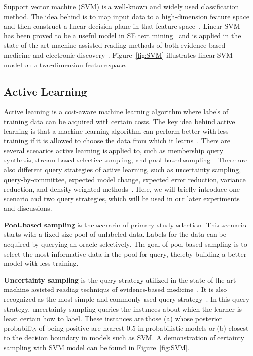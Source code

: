 \documentclass[final,twocolumn,5p]{elsarticle}
\theoremstyle{break}
\begin{document}
Support vector machine (SVM) is a well-known and widely used classification method. The idea behind is to map input data to a high-dimension feature space and then construct a linear decision plane in that feature space~\cite{cortes1995support}. Linear SVM~\cite{joachims2006training} has been proved to be a useful model in SE text mining~\cite{krishna2016bigse} and is applied in the state-of-the-art machine assisted reading methods of both evidence-based medicine and electronic discovery~\cite{wallace2010semi,cormack2014evaluation}. Figure~\ref{fig:SVM} illustrates linear SVM model on a two-dimension feature space.

\subsection{Active Learning}
\label{sect: Active learning}

Active learning is a cost-aware machine learning algorithm where labels of training data can be acquired with certain costs. The key idea behind active learning is that a machine learning algorithm can perform better with less
training if it is allowed to choose the data from which it learns~\cite{settles2012active}. There are several scenarios active learning is applied to, such as membership query synthesis, stream-based selective sampling, and pool-based sampling~\cite{settles2010active}. There are also different query strategies of active learning, such as uncertainty sampling, query-by-committee, expected model change, expected error reduction, variance reduction, and density-weighted methods~\cite{settles2010active}. Here, we will briefly introduce one scenario and two query strategies, which will be used in our later experiments and discussions.

\textbf{Pool-based sampling} is the scenario of primary study selection. This scenario starts with a fixed size pool of unlabeled data. Labels for the data can be acquired by querying an oracle selectively. The goal of pool-based sampling is to select the most informative data in the pool for query, thereby building a better model with less training.

\textbf{Uncertainty sampling} is the query strategy utilized in the state-of-the-art machine assisted reading technique of evidence-based medicine~\cite{wallace2010semi,wallace2010active}. It is also recognized as the most simple and commonly used query strategy~\cite{settles2010active}. In this query strategy, uncertainty sampling queries the instances about which the learner is least certain how to label. These instances are those (a) whose posterior probability of being positive are nearest 0.5 in probabilistic models or (b) closest to the decision boundary in models such as SVM. A demonstration of certainty sampling with SVM model can be found in Figure~\ref{fig:SVM}.
\end{document}
